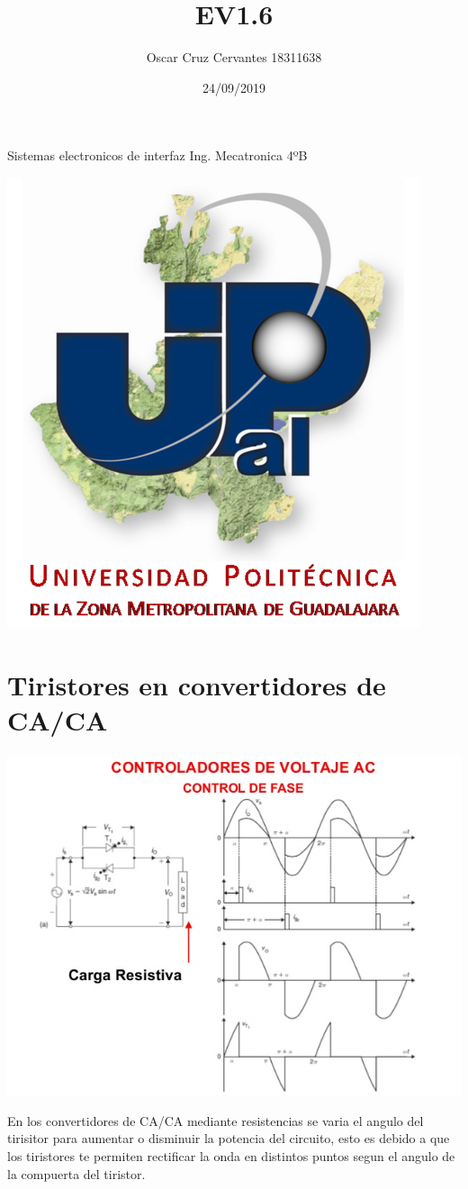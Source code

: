 \documentclass[10pt,a4paper]{article}
\author{Oscar Cruz Cervantes 18311638}
\title{EV1.6}
\date{24/09/2019}
\begin{document}
\maketitle
\begin{center}
Sistemas electronicos de interfaz
Ing. Mecatronica 4ºB
\end{center}
\begin{center}
\includegraphics{01.png}
\end{center}
\newpage
\section{Tiristores en convertidores de CA/CA}
\begin{center}
\includegraphics[scale=0.5]{02.jpg}
\end{center}
En los convertidores de CA/CA mediante resistencias se varia el angulo del tirisitor para aumentar o disminuir la potencia del circuito, esto es debido a que los tiristores te permiten rectificar la onda en distintos puntos segun el angulo de la compuerta del tiristor.
\end{document}
